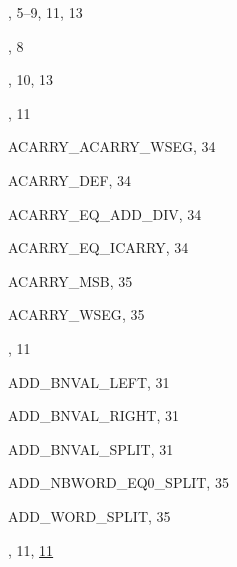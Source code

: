 \begin{theindex}

  \item {}, 5--9, 11, 13
  \item {}, 8
  \item {}, 10, 13

  \indexspace

  \item {}, 11
  \item {\ptt ACARRY\_ACARRY\_WSEG}, 34
  \item {\ptt ACARRY\_DEF}, 34
  \item {\ptt ACARRY\_EQ\_ADD\_DIV}, 34
  \item {\ptt ACARRY\_EQ\_ICARRY}, 34
  \item {\ptt ACARRY\_MSB}, 35
  \item {\ptt ACARRY\_WSEG}, 35
  \item {}, 11
  \item {\ptt ADD\_BNVAL\_LEFT}, 31
  \item {\ptt ADD\_BNVAL\_RIGHT}, 31
  \item {\ptt ADD\_BNVAL\_SPLIT}, 31
  \item {\ptt ADD\_NBWORD\_EQ0\_SPLIT}, 35
  \item {\ptt ADD\_WORD\_SPLIT}, 35
  \item {}, 11, \ul{11}

  \indexspace


\end{theindex}
